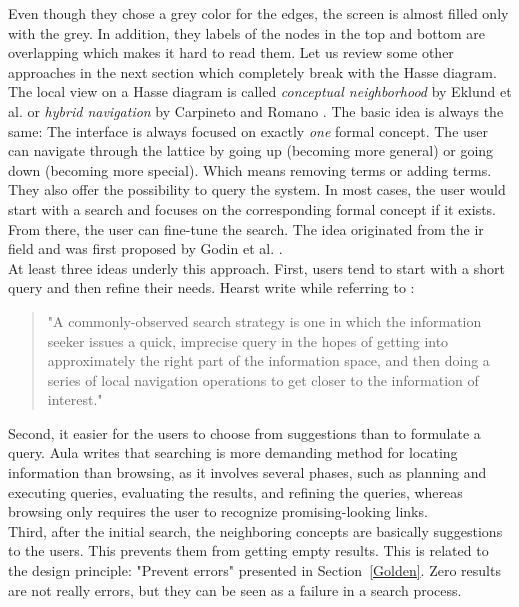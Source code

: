 \documentclass[11pt]{report}
\begin{document}
Even though they chose a grey color for the edges, the screen is almost filled only with the grey. In addition, they labels of the nodes in the top and bottom are overlapping which makes it hard to read them. Let us review some other approaches in the next section which completely break with the Hasse diagram. \\

The local view on a Hasse diagram is called \textit{conceptual neighborhood} by Eklund et al. \cite{Eklund2009,Eklund2012} or \textit{hybrid navigation} by Carpineto and Romano \cite{Carpineto1996}. The basic idea is always the same: The interface is always focused on exactly \textit{one} formal concept. The user can navigate through the lattice by going up (becoming more general) or going down (becoming more special). Which means removing terms or adding terms. They also offer the possibility to query the system. In most cases, the user would start with a search and focuses on the corresponding formal concept if it exists. From there, the user can fine-tune the search. The idea originated from the \acrshort{ir} field and was first proposed by Godin et al. \cite{Godin1989}. \\

At least three ideas underly this approach. First, users tend to start with a short query and then refine their needs. Hearst \cite{Hearst2009} write  while referring to \cite{Marchionini2006,Bates1990}:
\begin{quote}
	"A commonly-observed search strategy is one in which the information seeker issues a quick, imprecise query in the hopes of getting into approximately the right part of the information space, and then doing a series of local navigation operations to get closer to the information of interest."
\end{quote}

Second, it easier for the users to choose from suggestions than to formulate a query. Aula \cite{Aula2005} writes that searching is more demanding method for locating information than browsing, as it involves several phases, such as planning and executing queries, evaluating the results, and refining the queries, whereas browsing only requires the user to recognize promising-looking links. \\

Third, after the initial search, the neighboring concepts are basically suggestions to the users. This prevents them from getting empty results. This is related to the design principle: "Prevent errors" presented in Section~\ref{Golden}. Zero results are not really errors, but they can be seen as a failure in a search process.\\
\end{document}

